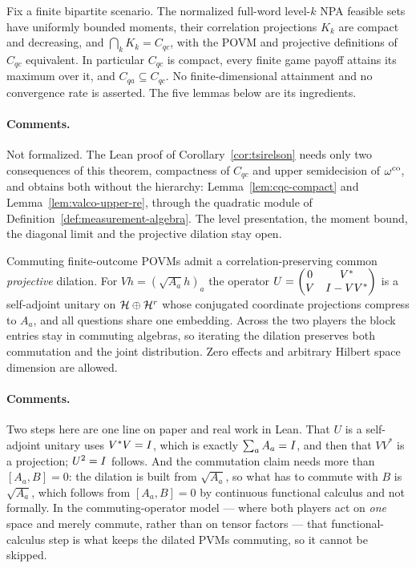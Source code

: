 \begin{theorem}
\label{thm:npa-convergence}
Fix a finite bipartite scenario. The normalized full-word level-$k$ NPA feasible sets have
uniformly bounded moments, their correlation projections $K_k$ are compact and decreasing, and
$\bigcap_k K_k = C_{qc}$, with the POVM and projective definitions of $C_{qc}$ equivalent. In
particular $C_{qc}$ is compact, every finite game payoff attains its maximum over it, and
$C_{qa} \subseteq C_{qc}$. No finite-dimensional attainment and no convergence rate is
asserted. The five lemmas below are its ingredients.
\end{theorem}

\paragraph{Comments.} Not formalized. The Lean proof of Corollary~\ref{cor:tsirelson} needs
only two consequences of this theorem, compactness of $C_{qc}$ and upper semidecision of
$\omega^{\mathrm{co}}$, and obtains both without the hierarchy: Lemma~\ref{lem:cqc-compact} and
Lemma~\ref{lem:valco-upper-re}, through the quadratic module of
Definition~\ref{def:measurement-algebra}. The level presentation, the moment bound, the
diagonal limit and the projective dilation stay open.

\begin{lemma}
\label{lem:npa-dilation}
Commuting finite-outcome POVMs admit a correlation-preserving common \emph{projective}
dilation. For $Vh = (\sqrt{A_a} h)_a$ the operator
$U = \begin{pmatrix} 0 & V^* \\ V & I - VV^* \end{pmatrix}$ is a self-adjoint
unitary on $\mathcal{H} \oplus \mathcal{H}^r$ whose conjugated coordinate projections compress to $A_a$, and
all questions share one embedding. Across the two players the block entries stay in commuting
algebras, so iterating the dilation preserves both commutation and the joint distribution. Zero
effects and arbitrary Hilbert space dimension are allowed.
\end{lemma}

\paragraph{Comments.} Two steps here are one line on paper and real work in Lean. That $U$ is a
self-adjoint unitary uses $V^*V = I$, which is exactly $\sum_a A_a = I$, and then that
$VV^*$ is a projection; $U^2 = I$ follows. And the commutation claim needs more than
$[A_a, B] = 0$: the dilation is built from $\sqrt{A_a}$, so what has to commute with $B$ is
$\sqrt{A_a}$, which follows from $[A_a, B] = 0$ by continuous functional calculus and not
formally. In the commuting-operator model --- where both players act on \emph{one} space and
merely commute, rather than on tensor factors --- that functional-calculus step is what keeps
the dilated PVMs commuting, so it cannot be skipped.

